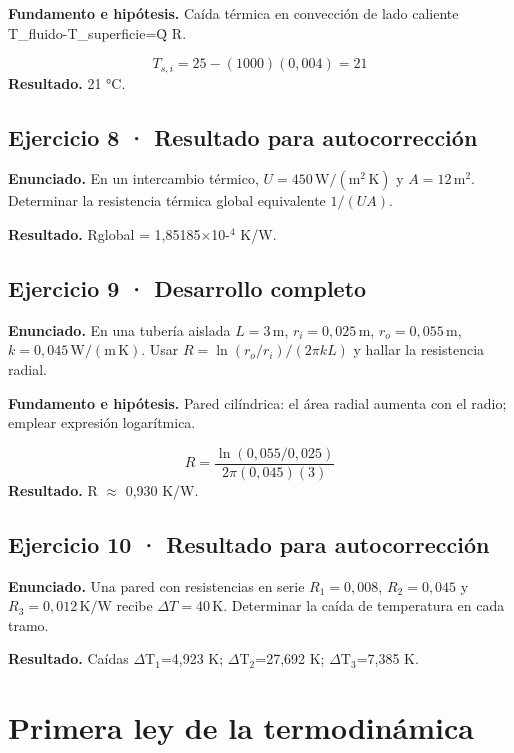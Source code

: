 \documentclass[11pt,a4paper]{article}
\begin{document}
\textbf{Fundamento e hipótesis.} Caída térmica en convección de lado caliente T\_fluido-T\_superficie=Q̇ R.

\[
T_{s,i}=25-(1000)(0{,}004)=21
\]
\textbf{Resultado.} 21 °C.


\subsection*{Ejercicio 8 · Resultado para autocorrección}
\textbf{Enunciado.} En un intercambio térmico, \(U=450\,\mathrm{W/(m^2\,K)}\) y \(A=12\,\mathrm m^2\). Determinar la resistencia térmica global equivalente \(1/(UA)\).

\textbf{Resultado.} Rglobal = 1,85185\ensuremath{\times}10-\ensuremath{^4} K/W.


\subsection*{Ejercicio 9 · Desarrollo completo}
\textbf{Enunciado.} En una tubería aislada \(L=3\,\mathrm m\), \(r_i=0{,}025\,\mathrm m\), \(r_o=0{,}055\,\mathrm m\), \(k=0{,}045\,\mathrm{W/(m\,K)}\). Usar \(R=\ln(r_o/r_i)/(2\pi kL)\) y hallar la resistencia radial.

\textbf{Fundamento e hipótesis.} Pared cilíndrica: el área radial aumenta con el radio; emplear expresión logarítmica.

\[
R=\frac{\ln(0{,}055/0{,}025)}{2\pi(0{,}045)(3)}
\]
\textbf{Resultado.} R \ensuremath{\approx} 0,930 K/W.


\subsection*{Ejercicio 10 · Resultado para autocorrección}
\textbf{Enunciado.} Una pared con resistencias en serie \(R_1=0{,}008\), \(R_2=0{,}045\) y \(R_3=0{,}012\,\mathrm{K/W}\) recibe \(\Delta T=40\,\mathrm K\). Determinar la caída de temperatura en cada tramo.

\textbf{Resultado.} Caídas \ensuremath{\Delta}T\ensuremath{_1}=4,923 K; \ensuremath{\Delta}T\ensuremath{_2}=27,692 K; \ensuremath{\Delta}T\ensuremath{_3}=7,385 K.


\clearpage

\section{Primera ley de la termodinámica}

\begin{center}\end{center}
\end{document}
